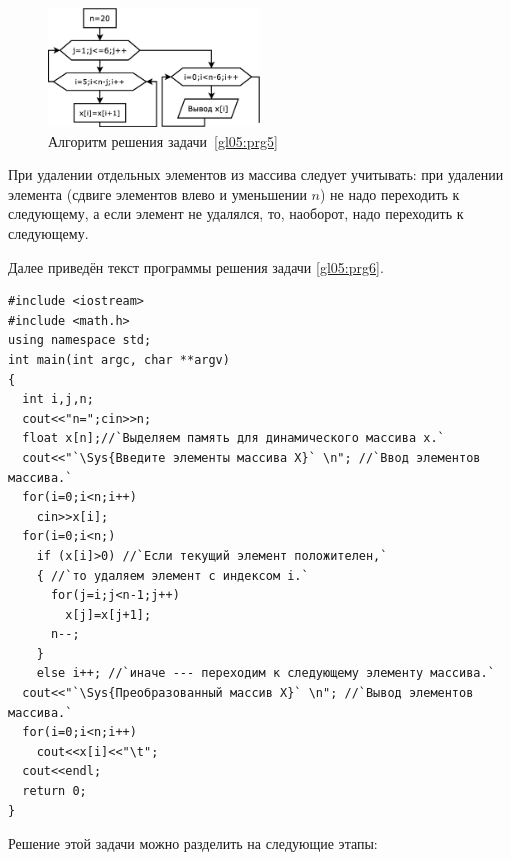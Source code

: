  
\begin{figure}[htb]
\begin{center}
\includegraphics[width=0.5\textwidth]{img/ris_5_11}
\caption{Алгоритм решения задачи~\ref{gl05:prg5}}
\label{ch05:refDrawing10}
\end{center}
\end{figure}


При удалении отдельных элементов из массива следует учитывать: при удалении элемента (сдвиге элементов влево и
уменьшении $n$) не надо переходить к следующему, а если элемент не удалялся, то, наоборот, надо переходить к следующему.

Далее приведён текст программы решения задачи \ref{gl05:prg6}.
\begin{lstlisting}
#include <iostream>
#include <math.h>
using namespace std;
int main(int argc, char **argv)
{
  int i,j,n;
  cout<<"n=";cin>>n;
  float x[n];//`Выделяем память для динамического массива x.`
  cout<<"`\Sys{Введите элементы массива X}` \n"; //`Ввод элементов массива.`
  for(i=0;i<n;i++)
    cin>>x[i];
  for(i=0;i<n;)
    if (x[i]>0) //`Если текущий элемент положителен,`
    { //`то удаляем элемент с индексом i.`
      for(j=i;j<n-1;j++)
        x[j]=x[j+1];
      n--;
    }
    else i++; //`иначе --- переходим к следующему элементу массива.`	
  cout<<"`\Sys{Преобразованный массив X}` \n"; //`Вывод элементов массива.`
  for(i=0;i<n;i++)
    cout<<x[i]<<"\t";
  cout<<endl;
  return 0;
}
\end{lstlisting}



Решение этой задачи можно разделить на следующие этапы:

